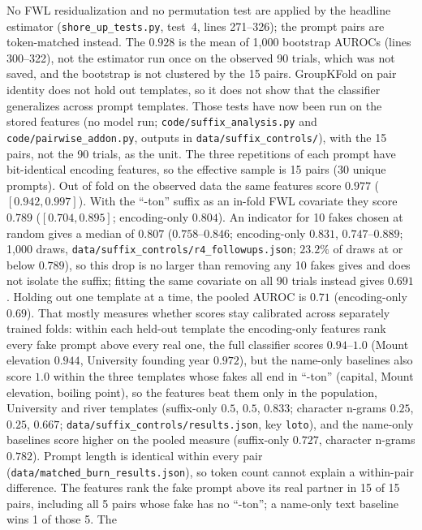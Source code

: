 \documentclass[11pt,a4paper]{article}
\begin{document}
No FWL residualization and no permutation test are applied by the
headline estimator (\texttt{shore\_up\_tests.py}, test~4, lines 271--326); the prompt pairs are token-matched instead. The $0.928$ is
the mean of 1{,}000 bootstrap AUROCs (lines 300--322), not the estimator
run once on the observed 90 trials, which was not saved, and the
bootstrap is not clustered by the 15 pairs. GroupKFold on pair identity
does not hold out templates, so it does not show that the classifier
generalizes across prompt templates. Those tests have now been run on
the stored features (no model run; \texttt{code/suffix\_analysis.py} and
\texttt{code/pairwise\_addon.py}, outputs in \texttt{data/suffix\_controls/}),
with the 15 pairs, not the 90
trials, as the unit. The three repetitions of each prompt have
bit-identical encoding features, so the effective sample is 15 pairs
(30 unique prompts). Out of fold on the observed data the same features
score $0.977$ ($[0.942, 0.997]$). With the ``-ton'' suffix as an in-fold
FWL covariate they score $0.789$ ($[0.704, 0.895]$; encoding-only
$0.804$). An indicator for 10 fakes chosen at random gives a median of $0.807$ ($0.758$--$0.846$; encoding-only $0.831$, $0.747$--$0.889$; 1{,}000 draws, \texttt{data/suffix\_controls/r4\_followups.json}; $23.2\%$ of draws at or below $0.789$), so this drop is no larger than removing any 10 fakes gives and does not isolate the suffix; fitting the same covariate on all 90 trials instead
gives $0.691$. Holding out one template at a time, the pooled AUROC is
$0.71$ (encoding-only $0.69$). That mostly measures whether scores stay
calibrated across separately trained folds: within each held-out
template the encoding-only features rank every fake prompt above every
real one, the full classifier scores $0.94$--$1.0$ (Mount elevation $0.944$, University founding year $0.972$), but the name-only baselines also score $1.0$ within the three templates whose fakes all end in ``-ton'' (capital, Mount elevation, boiling point), so the features beat them only in the population, University and river templates (suffix-only $0.5$, $0.5$, $0.833$; character n-grams $0.25$, $0.25$, $0.667$; \texttt{data/suffix\_controls/results.json}, key \texttt{loto}), and the name-only baselines score higher on the pooled measure (suffix-only $0.727$, character
n-grams $0.782$). Prompt length is identical within every pair
(\texttt{data/matched\_burn\_results.json}), so token count cannot
explain a within-pair difference. The features rank the fake prompt
above its real partner in 15 of 15 pairs, including all 5 pairs whose
fake has no ``-ton''; a name-only text baseline wins 1 of those 5. The
\end{document}
